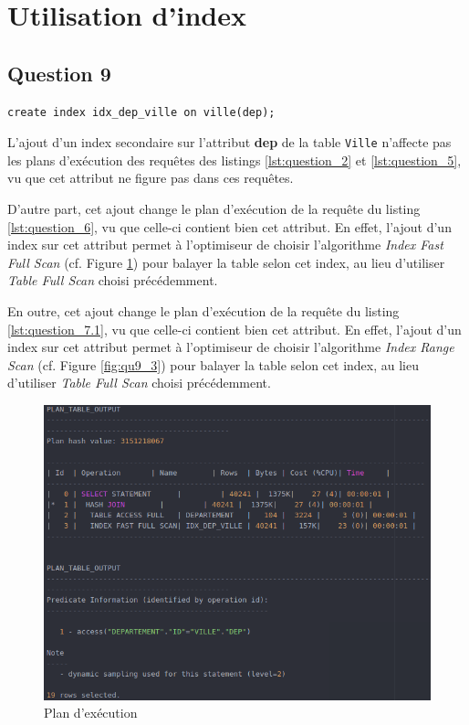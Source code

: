 \documentclass[a4paper,12pt]{article}
\begin{document}
\newpage

\section{Utilisation d'index}
\subsection{Question 9}
\begin{lstlisting}[caption={ajout d'un index secondaire sur l'attribut dep de la table Ville}]
  create index idx_dep_ville on ville(dep);
\end{lstlisting}

L'ajout d'un index secondaire sur l'attribut \textbf{dep} de la table \texttt{Ville} n'affecte pas les plans d'exécution des requêtes des listings  \ref{lst:question_2} et \ref{lst:question_5}, vu que cet attribut ne figure pas dans ces requêtes.

D'autre part, cet ajout change le plan d'exécution de la requête du listing \ref{lst:question_6}, vu que celle-ci contient bien cet attribut. En effet, l'ajout d'un index sur cet attribut permet à l'optimiseur de choisir l'algorithme \textit{Index Fast Full Scan} (cf. Figure \ref{fig:qu9_1}) pour balayer la table selon cet index, au lieu d'utiliser \textit{Table Full Scan} choisi précédemment.

En outre, cet ajout change le plan d'exécution de la requête du listing \ref{lst:question_7.1}, vu que celle-ci contient bien cet attribut. En effet, l'ajout d'un index sur cet attribut permet à l'optimiseur de choisir l'algorithme \textit{Index Range Scan} (cf. Figure \ref{fig:qu9_3}) pour balayer la table selon cet index, au lieu d'utiliser \textit{Table Full Scan} choisi précédemment.

\begin{figure}[!ht]
  \centering
  \includegraphics[scale=0.6]{images/q9_1.png}
  \caption{Plan d'exécution}
  \label{fig:qu9_1}
\end{figure}
\end{document}
